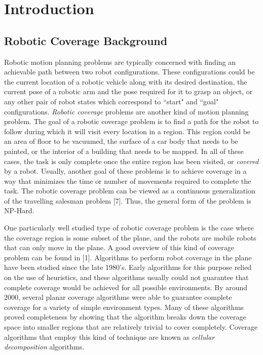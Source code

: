 \chapter{Introduction}

\section{Robotic Coverage Background}

Robotic motion planning problems are typically concerned with finding an achievable path between two robot configurations. These configurations could be the current location of a robotic vehicle along with its desired destination, the current pose of a robotic arm and the pose required for it to grasp an object, or any other pair of robot states which correspond to ``start" and ``goal" configurations. \textit{Robotic coverage} problems are another kind of motion planning problem. The goal of a robotic coverage problem is to find a path for the robot to follow during which it will visit every location in a region. This region could be an area of floor to be vacuumed, the surface of a car body that needs to be painted, or the interior of a building that needs to be mapped. In all of these cases, the task is only complete once the entire region has been visited, or \textit{covered} by a robot. Usually, another goal of these problems is to achieve coverage in a way that minimizes the time or number of movements required to complete the task. The robotic coverage problem can be viewed as a continuous generalization of the travelling salesman problem [7]. Thus, the general form of the problem is NP-Hard. 

One particularly well studied type of robotic coverage problem is the case where the coverage region is some subset of the plane, and the robots are mobile robots that can only move in the plane. A good overview of this kind of coverage problem can be found in [1]. Algorithms to perform robot coverage in the plane have been studied since the late 1980's. Early algorithms for this purpose relied on the use of heuristics, and these algorithms usually could not guarantee that complete coverage would be achieved for all possible environments. By around 2000, several planar coverage algorithms were able to guarantee complete coverage for a variety of simple environment types. Many of these algorithms proved completeness by showing that the algorithm breaks down the coverage space into smaller regions that are relatively trivial to cover completely. Coverage algorithms that employ this kind of technique are known as \textit{cellular decomposition} algorithms.


